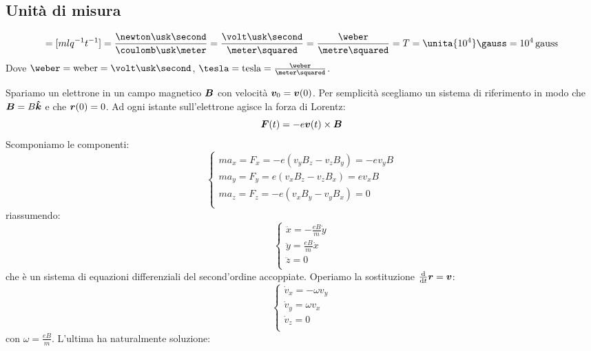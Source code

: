 \subsection{Unità di misura}
\begin{equation*}[B]=[mlq^{-1}t^{-1}]=\frac{\newton\usk\second}{\coulomb\usk\meter}=\frac{\volt\usk\second}{\meter\squared}=\frac{\weber}{\metre\squared}=T=\unita{10^4}\gauss=10^4\,\text{gauss}\end{equation*}
Dove $\weber=\text{weber}={\volt\usk\second}$, $\tesla=\text{tesla}=\frac{\weber}{\meter\squared}$.
\begin{Es}
\label{es_Larmor}
Spariamo un elettrone in un campo magnetico $\boldsymbol{B}$ con velocità $\boldsymbol{v}_0=\boldsymbol{v}(0)$. Per semplicità scegliamo un sistema di riferimento in modo che $\boldsymbol{B}=B\boldsymbol{\hat {k}}$ e che $\boldsymbol{r}(0)=0$. Ad ogni istante sull'elettrone agisce la forza di Lorentz:
\begin{equation*}\boldsymbol{F}(t)=-e\boldsymbol{v}(t)\times \boldsymbol{B}\end{equation*}
Scomponiamo le componenti:
\begin{equation*}\left\{
\begin{array}{l}
ma_x=F_x=-e\left(v_yB_z-v_zB_y\right)=-ev_yB\\
ma_y=F_y=e\left(v_xB_z-v_zB_x\right)=ev_xB\\
ma_z=F_z=-e\left(v_xB_y-v_yB_x\right)=0\\
\end{array}\right.\end{equation*}
riassumendo:
\begin{equation*}\left\{
\begin{array}{l}
\ddot x=-\frac{eB}{m}\dot y\\
\ddot y=\frac{eB}{m}\dot x\\
\ddot z=0\\
\end{array}\right.\end{equation*}
che è un sistema di equazioni differenziali del second'ordine accoppiate. Operiamo la sostituzione $\frac{\mathrm{d}}{\mathrm{d} t}\boldsymbol{r}=\boldsymbol{v}$:
\begin{equation*}
\left\{
\begin{array}{l}
\dot v_x=-\omega v_y\\
\dot v_y=\omega v_x\\
\dot v_z=0\\
\end{array}\right.\end{equation*}
con $\omega=\frac{eB}{m}$. L'ultima ha naturalmente soluzione:

\end{Es}
